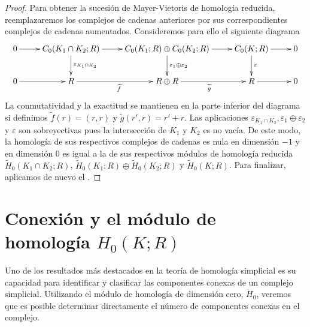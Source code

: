\begin{proof}
	Para obtener la sucesión de Mayer-Vietoris de homología reducida, reemplazaremos
	los complejos de cadenas anteriores por sus correspondientes complejos de cadenas
	aumentados. Consideremos para ello el siguiente diagrama
	\[
	\xymatrix{ 0 \ar@{->}[r] & C_0(K_1 \cap K_2;R) \ar@{->}[d]^{\varepsilon_{K_1 \cap K_2}} \ar@{->}[r] & C_0(K_1;R) \oplus C_0(K_2;R) \ar@{->}[r] \ar@{->}[d]^{\varepsilon_1 \oplus \varepsilon_2} & C_0(K;R) \ar@{->}[d]^{\varepsilon} \ar@{->}[r] & 0 \\ 0 \ar@{->}[r] & R \ar@{->}[r]_{\widetilde{f}} & R \oplus R \ar@{->}[r]_{\widetilde{g}} & R \ar@{->}[r] & 0 }
	\]
	La conmutatividad y la exactitud se mantienen en la parte inferior del
	diagrama si definimos $\widetilde{f}(r) = (r,r)$ y
	$\widetilde{g}(r',r) = r'+r$. Las aplicaciones $\varepsilon_{K_1 \cap K_2}, \varepsilon
	_{1}\oplus \varepsilon_{2}$ y $\varepsilon$ son sobreyectivas pues la intersección
	de $K_{1}$ y $K_{2}$ es no vacía. De este modo, la homología de sus respectivos
	complejos de cadenas es nula en dimensión $-1$ y en dimensión $0$ es igual a la
	de sus respectivos módulos de homología reducida $\widetilde{H}_{0}(K_{1}\cap K
	_{2};R)$, $\widetilde{H}_{0}(K_{1};R) \oplus \widetilde{H}_{0}(K_{2};R)$ y
	$\widetilde{H}_{0}(K;R)$. Para finalizar, aplicamos de nuevo el .
\end{proof}

\section{Conexión y el módulo de homología $H_{0}(K;R)$}

Uno de los resultados más destacados en la teoría de homología simplicial es su capacidad
para identificar y clasificar las componentes conexas de un complejo simplicial.
Utilizando el módulo de homología de dimensión cero, $H_{0}$, veremos que es
posible determinar directamente el número de componentes conexas en el complejo.

